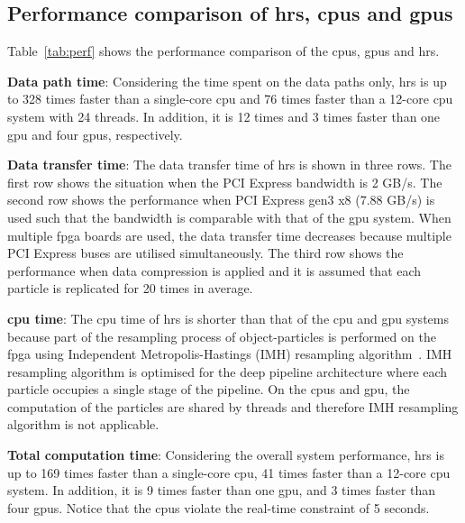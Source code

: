 \subsection{Performance comparison of \gls{hrs}, \gls{cpu}s and \gls{gpu}s}
Table~\ref{tab:perf} shows the performance comparison of the \gls{cpu}s, \gls{gpu}s and \gls{hrs}.

\textbf{Data path time}: Considering the time spent on the data paths only, \gls{hrs} is up to 328 times faster than a single-core \gls{cpu} and 76 times faster than a 12-core \gls{cpu} system with 24 threads.
In addition, it is 12 times and 3 times faster than one \gls{gpu} and four \gls{gpu}s, respectively.

\textbf{Data transfer time}: The data transfer time of \gls{hrs} is shown in three rows.
The first row shows the situation when the PCI Express bandwidth is 2 GB/s.
The second row shows the performance when PCI Express gen3 x8 (7.88 GB/s) is used such that the bandwidth is comparable with that of the \gls{gpu} system.
When multiple \gls{fpga} boards are used, the data transfer time decreases because multiple PCI Express buses are utilised simultaneously.
The third row shows the performance when data compression is applied and it is assumed that each particle is replicated for 20 times in average.

\textbf{\gls{cpu} time}: The \gls{cpu} time of \gls{hrs} is shorter than that of the \gls{cpu} and \gls{gpu} systems because part of the resampling process of object-particles is performed on the \gls{fpga} using Independent Metropolis-Hastings (IMH) resampling algorithm~\cite{miao11}.
IMH resampling algorithm is optimised for the deep pipeline architecture where each particle occupies a single stage of the pipeline.
On the \gls{cpu}s and \gls{gpu}, the computation of the particles are shared by threads and therefore IMH resampling algorithm is not applicable.

\textbf{Total computation time}: Considering the overall system performance, \gls{hrs} is up to 169 times faster than a single-core \gls{cpu}, 41 times faster than a 12-core \gls{cpu} system.
In addition, it is 9 times faster than one \gls{gpu}, and 3 times faster than four \gls{gpu}s.
Notice that the \gls{cpu}s violate the real-time constraint of 5 seconds.

